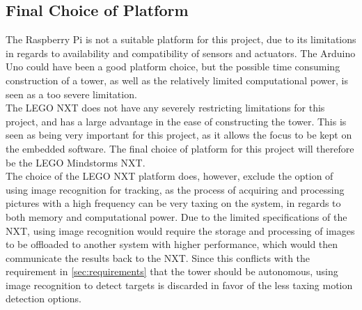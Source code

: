 \subsection{Final Choice of Platform}\label{platchoice}
The Raspberry Pi is not a suitable platform for this project, due to its limitations in regards to availability and compatibility of sensors and actuators. The Arduino Uno could have been a good platform choice, but the possible time consuming construction of a tower, as well as the relatively limited computational power, is seen as a too severe limitation. \\

The LEGO NXT does not have any severely restricting limitations for this project, and has a large advantage in the ease of constructing the tower. This is seen as being very important for this project, as it allows the focus to be kept on the embedded software. The final choice of platform for this project will therefore be the LEGO Mindstorms NXT. \\

The choice of the LEGO NXT platform does, however, exclude the option of using image recognition for tracking, as the process of acquiring and processing pictures with a high frequency can be very taxing on the system, in regards to both memory and computational power. Due to the limited specifications of the NXT, using image recognition would require the storage and processing of images to be offloaded to another system with higher performance, which would then communicate the results back to the NXT. Since this conflicts with the requirement in \cref{sec:requirements} that the tower should be autonomous, using image recognition to detect targets is discarded in favor of the less taxing motion detection options.

